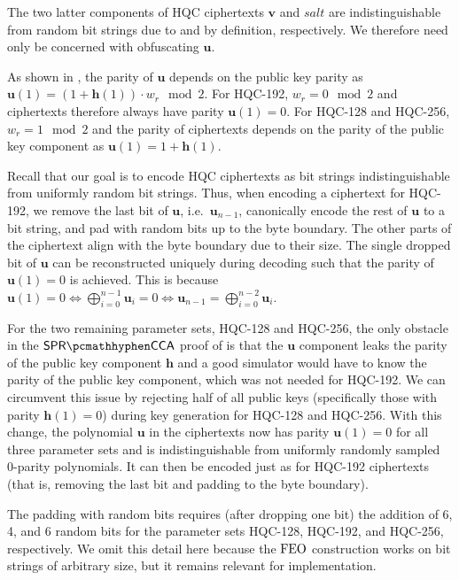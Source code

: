 The two latter components of HQC ciphertexts $\mathbf v$ and $\mathit{salt}$ are indistinguishable from random bit strings due to \cite{EC:Xagawa22} and by definition, respectively. We therefore need only be concerned with obfuscating $\mathbf u$.

As shown in \cite{EC:Xagawa22}, the parity of $\mathbf u$ depends on the public key parity as $\mathbf u(1)=(1 + \mathbf h(1))\cdot w_r \mod 2$. For HQC-192, $w_r = 0 \mod 2$ and ciphertexts therefore always have parity $\mathbf u(1)=0$. For HQC-128 and HQC-256, $w_r = 1 \mod 2$ and the parity of ciphertexts depends on the parity of the public key component as $\mathbf u(1)=1 + \mathbf h(1)$.

Recall that our goal is to encode HQC ciphertexts as bit strings indistinguishable from uniformly random bit strings. Thus, when encoding a ciphertext for HQC-192, we remove the last bit of $\mathbf u$, i.e.~$\mathbf u_{n-1}$, canonically encode the rest of $\mathbf u$ to a bit string, and pad with random bits up to the byte boundary. The other parts of the ciphertext align with the byte boundary due to their size. The single dropped bit of $\mathbf u$ can be reconstructed uniquely during decoding such that the parity of $\mathbf u(1)=0$ is achieved. This is because $\mathbf u(1)=0 \iff \bigoplus_{i=0}^{n-1} \mathbf u_i = 0 \iff \mathbf u_{n-1} = \bigoplus_{i=0}^{n-2} \mathbf u_i$.

For the two remaining parameter sets, HQC-128 and HQC-256, the only obstacle in the $\sprcca$ proof of \cite{EC:Xagawa22} is that the $\mathbf u$ component leaks the parity of the public key component $\mathbf h$ and a good simulator would have to know the parity of the public key component, which was not needed for HQC-192.
We can circumvent this issue by rejecting half of all public keys (specifically those with parity $\mathbf h(1)=0$) during key generation for HQC-128 and HQC-256.
With this change, the polynomial $\mathbf u$ in the ciphertexts now has parity $\mathbf u(1)=0$ for all three parameter sets and is indistinguishable from uniformly randomly sampled 0-parity polynomials. It can then be encoded just as for HQC-192 ciphertexts (that is, removing the last bit and padding to the byte boundary).

The padding with random bits requires (after dropping one bit) the addition of 6, 4, and 6 random bits for the parameter sets HQC-128, HQC-192, and HQC-256, respectively. We omit this detail here because the $\textsf{\textnormal{FEO}}$ construction works on bit strings of arbitrary size, but it remains relevant for implementation.


